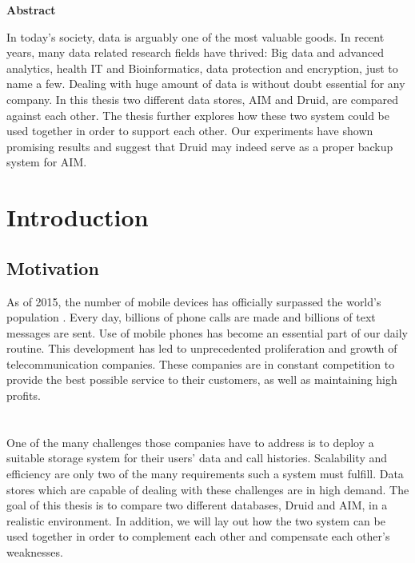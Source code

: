 \documentclass[11pt,singlecolumn]{scrartcl}
\begin{document}

\hspace{60mm}
\begin{center}
 \textbf{Abstract} \end{center}


In today's society, data is arguably one of the most valuable goods. In recent years, many data related research fields have thrived: Big data and advanced analytics, health IT and Bioinformatics, data protection and encryption, just to name a few. Dealing with huge amount of data is without doubt essential for any company. In this thesis two different data stores, AIM and Druid, are compared against each other. The thesis further explores how these two system could be used together in order to support each other. Our experiments have shown promising results and suggest that Druid may indeed serve as a proper backup system for AIM.


\clearpage
\tableofcontents
\clearpage
\section{Introduction}
\subsection{Motivation}
As of 2015, the number of mobile devices has officially surpassed the world's population \cite{ind}. Every day, billions of phone calls are made and billions of text messages are sent. Use of mobile phones has become an essential part of our daily routine. This development has led to unprecedented proliferation and growth of telecommunication companies. These companies are in constant competition to provide the best possible service to their customers, as well as maintaining high profits.\\\\\\One of the many challenges those companies have to address is to deploy a suitable storage system for their users' data and call histories. Scalability and efficiency are only two of the many requirements such a system must fulfill. Data stores which are capable of dealing with these challenges are in high demand. The goal of this thesis is to compare two different databases, Druid and AIM, in a realistic environment. In addition, we will lay out how the two system can be used together in order to complement each other and compensate each other's weaknesses.\\[1 cm]
\end{document}

